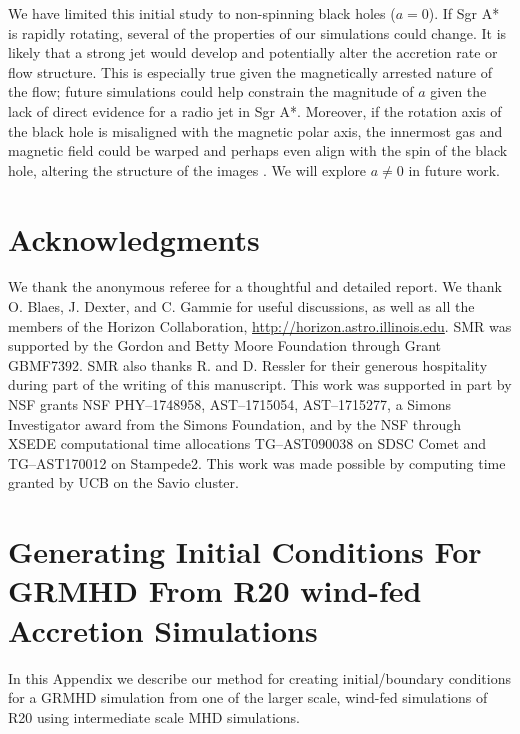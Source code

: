 \documentclass[twocolumn,twocolappendix,apjl,appendixfloats]{aastex63}
\begin{document}
We have limited this initial study to non-spinning black holes ($a=0$).  If Sgr A* is rapidly rotating, several of the properties of our simulations could change.  
It is likely that a strong \citet{BZ1977} jet would develop and potentially alter the accretion rate or flow structure.  This is especially true given the magnetically arrested nature of the flow; future simulations could help constrain the magnitude of $a$ given the lack of direct evidence for a radio jet in Sgr A*.  Moreover, if the rotation axis of the black hole is misaligned with the magnetic polar axis, the innermost gas and magnetic field could be warped and perhaps even align with the spin of the black hole, altering the structure of the images \citep{Liska2018,White2019b,White2020,Chatterjee2020}.   We will explore $a \ne 0$ in future work.
 
\section*{Acknowledgments}
We thank the anonymous referee for a thoughtful and detailed report. We thank O. Blaes, J. Dexter, and C. Gammie for useful discussions, as well as all the members of the Horizon Collaboration, \href{http://horizon.astro.illinois.edu}{http://horizon.astro.illinois.edu}. SMR was supported by the Gordon and Betty Moore Foundation through Grant GBMF7392.  SMR also thanks R. and D. Ressler for
their generous hospitality during part of the writing of this manuscript.
This work was supported in part by NSF grants NSF PHY--1748958,  AST--1715054, AST--1715277, a Simons Investigator award from the Simons Foundation, and by the NSF
through XSEDE computational time allocations TG--AST090038
on SDSC Comet and TG--AST170012 on Stampede2.  This work was made possible by computing time granted by UCB on the Savio cluster.




\appendix
\section{Generating Initial Conditions For GRMHD From R20 wind-fed Accretion Simulations}
\label{app:inits}

In this Appendix we describe our method for creating initial/boundary conditions for a GRMHD simulation from one of the larger scale, wind-fed simulations of R20 using intermediate scale MHD simulations.
\end{document}
